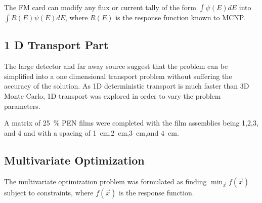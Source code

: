 The FM card can modify any flux or current tally of the form $\int \psi (E) dE$ into $\int R(E)\psi(E) dE$, where $R(E)$ is the response function known to MCNP.
\subsection{1 D Transport Part}
The large detector and far away source suggest that the problem can be simplified into a one dimensional transport problem without suffering the accuracy of the solution.
As 1D deterministic transport is much faster than 3D Monte Carlo, 1D transport was explored in order to vary the problem parameters.

A matrix of \SI{25}{\percent}  PEN films were completed with the film assemblies being 1,2,3, and 4 and with a spacing of \SI{1}{\centi\meter},\SI{2}{\centi\meter},\SI{3}{\centi\meter},and \SI{4}{\centi\meter}. 
\subsection{Multivariate Optimization}
\label{sec:MVOptimization}

The multivariate optimization problem was formulated as finding $\min_{\vec{x}} f (\vec{x})$ subject to constraints, where $f(\vec{x})$ is the response function.
